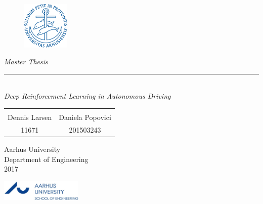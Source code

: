 \thispagestyle{empty}

\begin{figure}[H]
	\raggedleft
	\includegraphics[width=0.2\textwidth]{Figures/Aarhus_University_logo.png}
\end{figure}

\begin{center}
\textsl{\HUGE Master Thesis } \\ \vspace{0cm}
\rule{15cm}{0.5mm}  \\ \vspace{0.5cm}
\textsl{\LARGE Deep Reinforcement Learning in Autonomous Driving}
\vfill
\begin{table}[H]
	\centering
		\begin{tabular}{c c}
			\underline{\phantom{mmmmmmmmmmmmmmmm}} & \underline{\phantom{mmmmmmmmmmmmmmmm}}  
			\\
			 Dennis Larsen		& Daniela Popovici 	
			 \\
			 11671				& 201503243																	
		\end{tabular}
\end{table}

Aarhus University \\
Department of Engineering \\
2017
\end{center}

\newpage

{}


\begin{minipage}[t]{0.48\textwidth}
\vspace*{14pt}			%
\vspace{1.2cm}
\includegraphics[height=1cm]{Figures/au_ingenioerhoejskolen_en_logo.jpg} 
\end{minipage}
\hfill

\vspace*{1cm}

